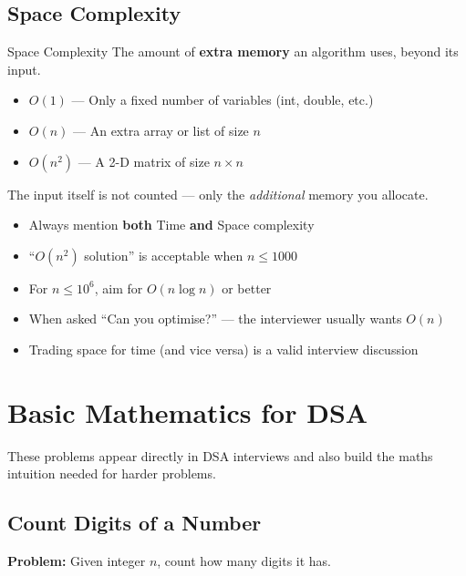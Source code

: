 \documentclass[12pt,a4paper,oneside]{book}
\begin{document}
\section{Space Complexity}

\begin{definitionbox}{Space Complexity}
The amount of \textbf{extra memory} an algorithm uses, beyond its input.
\begin{itemize}
  \item $O(1)$ --- Only a fixed number of variables (int, double, etc.)
  \item $O(n)$ --- An extra array or list of size $n$
  \item $O(n^2)$ --- A 2-D matrix of size $n \times n$
\end{itemize}
The input itself is not counted --- only the \textit{additional} memory you allocate.
\end{definitionbox}

\begin{interviewcorner}
\begin{itemize}
  \item Always mention \textbf{both} Time \textbf{and} Space complexity
  \item ``$O(n^2)$ solution'' is acceptable when $n \leq 1000$
  \item For $n \leq 10^6$, aim for $O(n \log n)$ or better
  \item When asked ``Can you optimise?'' --- the interviewer usually wants $O(n)$
  \item Trading space for time (and vice versa) is a valid interview discussion
\end{itemize}
\end{interviewcorner}

\chapter{Basic Mathematics for DSA}

These problems appear directly in DSA interviews and also build the maths intuition needed for harder problems.

\section{Count Digits of a Number}

\textbf{Problem:} Given integer $n$, count how many digits it has.
\end{document}
